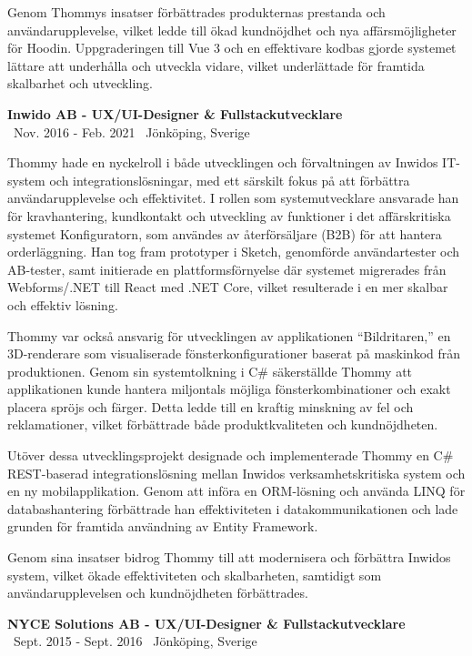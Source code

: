 \documentclass[a4paper,10pt]{article}
\begin{document}
Genom Thommys insatser förbättrades produkternas prestanda och användarupplevelse, vilket ledde till ökad kundnöjdhet och nya affärsmöjligheter för Hoodin. Uppgraderingen till Vue 3 och en effektivare kodbas gjorde systemet lättare att underhålla och utveckla vidare, vilket underlättade för framtida skalbarhet och utveckling.

\vspace{0.5cm}
\textbf{Inwido AB - UX/UI-Designer \& Fullstackutvecklare}\\
\normalsize \faCalendar \ Nov. 2016 - Feb. 2021 \quad \faMapMarker \ Jönköping, Sverige

Thommy hade en nyckelroll i både utvecklingen och förvaltningen av Inwidos IT-system och integrationslösningar, med ett särskilt fokus på att förbättra användarupplevelse och effektivitet. I rollen som systemutvecklare ansvarade han för kravhantering, kundkontakt och utveckling av funktioner i det affärskritiska systemet Konfiguratorn, som användes av återförsäljare (B2B) för att hantera orderläggning. Han tog fram prototyper i Sketch, genomförde användartester och AB-tester, samt initierade en plattformsförnyelse där systemet migrerades från Webforms/.NET till React med .NET Core, vilket resulterade i en mer skalbar och effektiv lösning.

Thommy var också ansvarig för utvecklingen av applikationen “Bildritaren,” en 3D-renderare som visualiserade fönsterkonfigurationer baserat på maskinkod från produktionen. Genom sin systemtolkning i C\# säkerställde Thommy att applikationen kunde hantera miljontals möjliga fönsterkombinationer och exakt placera spröjs och färger. Detta ledde till en kraftig minskning av fel och reklamationer, vilket förbättrade både produktkvaliteten och kundnöjdheten.

Utöver dessa utvecklingsprojekt designade och implementerade Thommy en C\# REST-baserad integrationslösning mellan Inwidos verksamhetskritiska system och en ny mobilapplikation. Genom att införa en ORM-lösning och använda LINQ för databashantering förbättrade han effektiviteten i datakommunikationen och lade grunden för framtida användning av Entity Framework.

Genom sina insatser bidrog Thommy till att modernisera och förbättra Inwidos system, vilket ökade effektiviteten och skalbarheten, samtidigt som användarupplevelsen och kundnöjdheten förbättrades.

\vspace{0.5cm}
\textbf{NYCE Solutions AB - UX/UI-Designer \& Fullstackutvecklare}\\
\normalsize \faCalendar \ Sept. 2015 - Sept. 2016 \quad \faMapMarker \ Jönköping, Sverige
\end{document}
